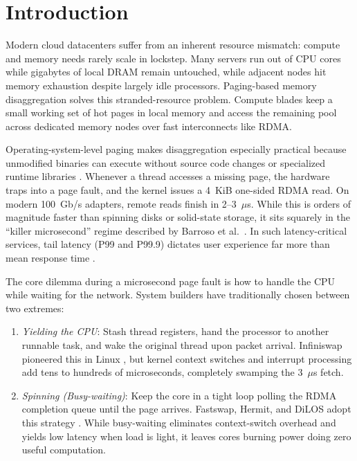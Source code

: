 \section{Introduction}
Modern cloud datacenters suffer from an inherent resource mismatch: compute and memory needs rarely scale in lockstep. Many servers run out of CPU cores while gigabytes of local DRAM remain untouched, while adjacent nodes hit memory exhaustion despite largely idle processors. Paging-based memory disaggregation solves this stranded-resource problem. Compute blades keep a small working set of hot pages in local memory and access the remaining pool across dedicated memory nodes over fast interconnects like RDMA.

Operating-system-level paging makes disaggregation especially practical because unmodified binaries can execute without source code changes or specialized runtime libraries \cite{infiniswap,fastswap,hermit,dilos}. Whenever a thread accesses a missing page, the hardware traps into a page fault, and the kernel issues a 4~KiB one-sided RDMA read. On modern 100~Gb/s adapters, remote reads finish in 2--3~$\mu$s. While this is orders of magnitude faster than spinning disks or solid-state storage, it sits squarely in the ``killer microsecond'' regime described by Barroso et al.\ \cite{killer}. In such latency-critical services, tail latency (P99 and P99.9) dictates user experience far more than mean response time \cite{tail,tales}.

The core dilemma during a microsecond page fault is how to handle the CPU while waiting for the network. System builders have traditionally chosen between two extremes:
\begin{enumerate}
\item \emph{Yielding the CPU}: Stash thread registers, hand the processor to another runnable task, and wake the original thread upon packet arrival. Infiniswap pioneered this in Linux \cite{infiniswap}, but kernel context switches and interrupt processing add tens to hundreds of microseconds, completely swamping the 3~$\mu$s fetch.
\item \emph{Spinning (Busy-waiting)}: Keep the core in a tight loop polling the RDMA completion queue until the page arrives. Fastswap, Hermit, and DiLOS adopt this strategy \cite{fastswap,hermit,dilos}. While busy-waiting eliminates context-switch overhead and yields low latency when load is light, it leaves cores burning power doing zero useful computation.
\end{enumerate}

